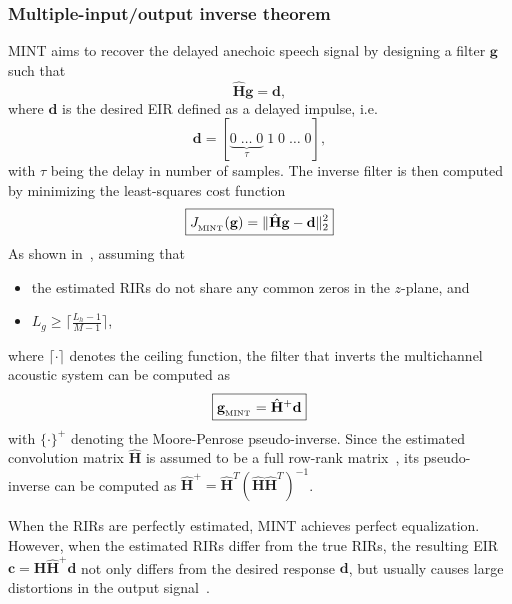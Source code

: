\documentclass[10pt]{IEEEtran}
\begin{document}
\subsubsection*{Multiple-input/output inverse theorem~\cite{Miyoshi_ITASS_1988}}
MINT aims to recover the delayed anechoic speech signal by designing a filter $\mathbf{g}$ such that
\begin{equation}
  \label{eq: minttar}
  \hat{\mathbf{H}}\mathbf{g} = \mathbf{d},
\end{equation}
where $\mathbf{d}$ is the desired EIR defined as a delayed impulse, i.e.
\begin{equation}
  \mathbf{d} = [\underbrace{0 \; \ldots \; 0}_{\tau} \; 1 \; 0 \; \ldots \; 0 ],
\end{equation}
with $\tau$ being the delay in number of samples.
The inverse filter is then computed by minimizing the least-squares cost function
\begin{equation}
\label{eq: ls}
\boxed{J_{_{\rm MINT}}(\mathbf{g}) = \|\hat{\mathbf{H}}\mathbf{g} - \mathbf{d}\|_2^2}
\end{equation}
As shown in~\cite{Miyoshi_ITASS_1988}, assuming that
\begin{itemize}
  \item the estimated RIRs do not share any common zeros in the $z$-plane, and
  \item $L_g \geq \lceil{\frac{L_h-1}{M-1}\rceil}$,
\end{itemize}
where $\lceil{ \cdot \rceil}$ denotes the ceiling function, the filter that inverts the multichannel acoustic system can be computed as
\begin{equation}
  \label{eq: mint}
  \boxed{\mathbf{g}_{{}_{\rm MINT}} = \hat{\mathbf{H}}^+\mathbf{d}}
\end{equation}
with $\{\cdot\}^+$ denoting the Moore-Penrose pseudo-inverse.
Since the estimated convolution matrix $\hat{\mathbf{H}}$ is assumed to be a full row-rank matrix~\cite{Harikumar_ITSP_1998}, its pseudo-inverse can be computed as $\hat{\mathbf{H}}^+ = \hat{\mathbf{H}}^T(\hat{\mathbf{H}}\hat{\mathbf{H}}^T)^{-1}$.

When the RIRs are perfectly estimated, MINT achieves perfect equalization.
However, when the estimated RIRs differ from the true RIRs, the resulting EIR $\mathbf{c} = \mathbf{H} \hat{\mathbf{H}}^+ \mathbf{d}$ not only differs from the desired response $\mathbf{d}$, but usually causes large distortions in the output signal~\cite{Radlovic_ITSA_2000, Hikichi_EURASIP_2007}.
\end{document}
